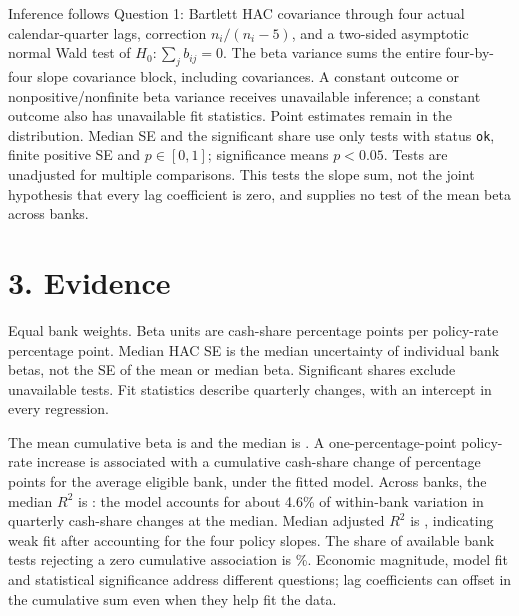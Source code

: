 \documentclass[10pt]{article}
\begin{document}
Inference follows Question 1: Bartlett HAC covariance through four actual calendar-quarter lags, correction \(n_i/(n_i-5)\), and a two-sided asymptotic normal Wald test of \(H_0:\sum_j b_{ij}=0\). The beta variance sums the entire four-by-four slope covariance block, including covariances. A constant outcome or nonpositive/nonfinite beta variance receives unavailable inference; a constant outcome also has unavailable fit statistics. Point estimates remain in the distribution. Median SE and the significant share use only tests with status \texttt{ok}, finite positive SE and \(p\in[0,1]\); significance means \(p<0.05\). Tests are unadjusted for multiple comparisons. This tests the slope sum, not the joint hypothesis that every lag coefficient is zero, and supplies no test of the mean beta across banks.

\section*{3. Evidence}
\begin{table}[H]
\centering
\caption{Bank-level cash-share responses and model fit}

\begin{minipage}{0.9\textwidth}\footnotesize
Equal bank weights. Beta units are cash-share percentage points per policy-rate percentage point. Median HAC SE is the median uncertainty of individual bank betas, not the SE of the mean or median beta. Significant shares exclude \QTwoUnavailableTests{} unavailable tests. Fit statistics describe quarterly changes, with an intercept in every regression.
\end{minipage}
\end{table}

The mean cumulative beta is \QTwoMeanBeta{} and the median is \QTwoMedianBeta{}. A one-percentage-point policy-rate increase is associated with a cumulative cash-share change of \QTwoMeanBeta{} percentage points for the average eligible bank, under the fitted model. Across banks, the median \(R^2\) is \QTwoMedianRSquared{}: the model accounts for about 4.6\% of within-bank variation in quarterly cash-share changes at the median. Median adjusted \(R^2\) is \QTwoMedianAdjustedRSquared{}, indicating weak fit after accounting for the four policy slopes. The share of available bank tests rejecting a zero cumulative association is \QTwoSignificantShare{}\%. Economic magnitude, model fit and statistical significance address different questions; lag coefficients can offset in the cumulative sum even when they help fit the data.
\end{document}
